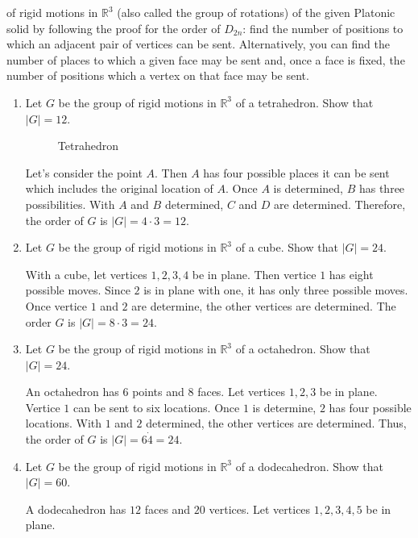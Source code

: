 of rigid motions in \(\mathbb{R}^3\) (also called the group of rotations) of
the given Platonic solid by following the proof for the order of \(D_{2n}\):
find the number of positions to which an adjacent pair of vertices can be sent.
Alternatively, you can find the number of places to which a given  face may be
sent and, once a face is fixed, the number of positions which a vertex on that
face may be sent.
\begin{enumerate}[resume]
\item
  Let \(G\) be the group of rigid motions in \(\mathbb{R}^3\) of a tetrahedron.
  Show that \(\lvert G\rvert = 12\).
  \begin{figure}[H]
    \centering
    
    \caption{Tetrahedron}
    \label{tetrahedron}
  \end{figure}
  Let's consider the point \(A\).
  Then \(A\) has four possible places it can be sent which includes the
  original location of \(A\).
  Once \(A\) is determined, \(B\) has three possibilities.
  With \(A\) and \(B\) determined, \(C\) and \(D\) are determined.
  Therefore, the order of \(G\) is \(\lvert G\rvert = 4\cdot 3 = 12\).
\item
  Let \(G\) be the group of rigid motions in \(\mathbb{R}^3\) of a cube.
  Show that \(\lvert G\rvert = 24\).
  \par\smallskip
  With a cube, let vertices \(1,2,3,4\) be in plane.
  Then vertice \(1\) has eight possible moves.
  Since \(2\) is in plane with one, it has only three possible moves.
  Once vertice \(1\) and \(2\) are determine, the other vertices are
  determined.
  The order \(G\) is \(\lvert G\rvert = 8\cdot 3 = 24\).
\item
  Let \(G\) be the group of rigid motions in \(\mathbb{R}^3\) of a octahedron.
  Show that \(\lvert G\rvert = 24\).
  \par\smallskip
  An octahedron has \(6\) points and \(8\) faces.
  Let vertices \(1,2,3\) be in plane.
  Vertice \(1\) can be sent to six locations.
  Once \(1\) is determine, \(2\) has four possible locations.
  With \(1\) and \(2\) determined, the other vertices are determined.
  Thus, the order of \(G\) is \(\lvert G\rvert = 6\dot 4 = 24\).
\item
  Let \(G\) be the group of rigid motions in \(\mathbb{R}^3\) of a
  dodecahedron.
  Show that \(\lvert G\rvert = 60\).
  \par\smallskip
  A dodecahedron has \(12\) faces and \(20\) vertices.
  Let vertices \(1,2,3,4,5\) be in plane.

\end{enumerate}
